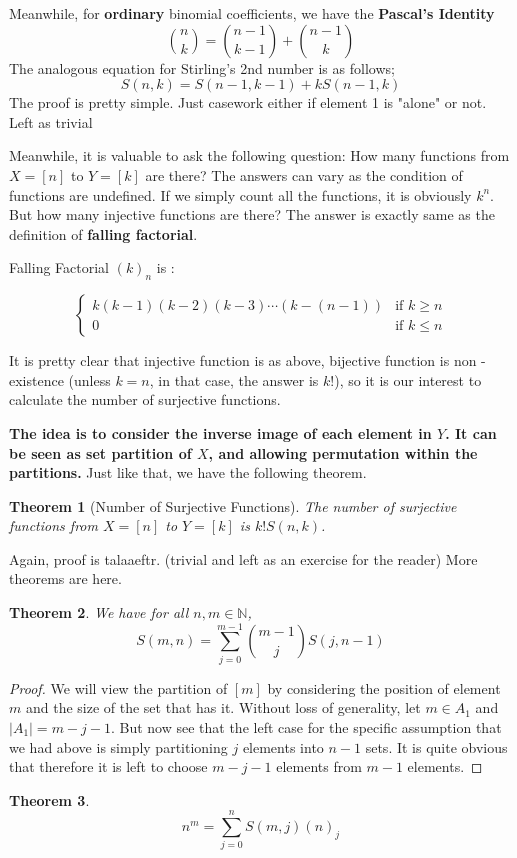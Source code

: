 \documentclass[12pt]{article}
\newtheorem{theorem}{Theorem}[section]
\newcommand{\mb}{\mathbb}
\begin{document}
Meanwhile, for \textbf{ordinary} binomial coefficients, we have the \textbf{Pascal's Identity}
\[
\binom{n}{k} = \binom{n-1}{k-1} + \binom{n-1}{k}
\]
The analogous equation for Stirling's 2nd number is as follows;
\[
S(n,k) = S(n-1,k-1) + kS(n-1,k)
\]
The proof is pretty simple. Just casework either if element 1 is "alone" or not. Left as trivial

Meanwhile, it is valuable to ask the following question: How many functions from $X = [n]$ to $Y = [k] $ are there? The answers can vary as the condition of functions are undefined. If we simply count all the functions, it is obviously $k^n$. But how many injective functions are there? The answer is exactly same as the definition of \textbf{falling factorial}.

\begin{description}
  \item[Falling Factorial $(k)_n$ is :]
\end{description}
\[
\begin{cases}
  k(k-1)(k-2)(k-3) \cdots (k-(n-1)) &\text{if } k \geq n \\
  0 &\text{if } k \leq n
\end{cases}
\]

It is pretty clear that injective function is as above, bijective function is non - existence (unless $k = n$, in that case, the answer is $k!$), so it is our interest to calculate the number of surjective functions.

\textbf{The idea is to consider the inverse image of each element in $Y$. It can be seen as set partition of $X$, and allowing permutation within the partitions.} Just like that, we have the following theorem.

\begin{theorem}[Number of Surjective Functions]
  The number of surjective functions from $X = [n]$ to $Y = [k]$ is $k!S(n,k)$.
\end{theorem}
 Again, proof is talaaeftr. (trivial and left as an exercise for the reader)
 More theorems are here.
\begin{theorem} We have for all $n,m\in \mb{N}$,
\[
S(m,n) = \sum_{j=0}^{m-1} \binom{m-1}{j} S(j,n-1)
\]
\end{theorem}
\begin{proof}
  We will view the partition of $[m]$ by considering the position of element $m$ and the size of the set that has it. Without loss of generality, let $m \in A_1$ and $|A_1| = m -j-1$. But now see that the left case for the specific assumption that we had above is simply partitioning $j$ elements into $n-1$ sets. It is quite obvious that therefore it is left to choose $m-j-1$ elements from $m-1$ elements.

\end{proof}

\begin{theorem}
\[
n^m = \sum_{j=0}^{n} S(m,j)(n)_j
\]
\end{theorem}
\end{document}
